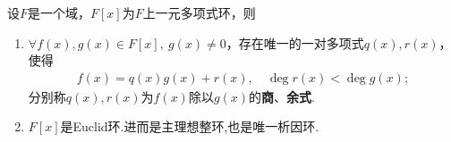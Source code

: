 \documentclass[../../main.tex]{subfiles}%
\begin{document}
\begin{theorem}\label{theorem:抽象代数--定理2.6.1}
设$F$是一个域，$F[x]$为$F$上一元多项式环，则
\begin{enumerate}[(1)]
\item\label{theorem:抽象代数--定理2.6.1-1} $\forall f(x), g(x) \in F[x],\ g(x) \neq 0$，存在唯一的一对多项式$q(x), r(x)$，使得
\begin{align*}
f(x) = q(x)g(x) + r(x),\quad \deg r(x) < \deg g(x);
\end{align*}
分别称$q(x), r(x)$为$f(x)$除以$g(x)$的\textbf{商}、\textbf{余式}.

\item\label{theorem:抽象代数--定理2.6.1-2} $F[x]$是Euclid环.进而是主理想整环,也是唯一析因环.
\end{enumerate}
\end{theorem}
\end{document}
